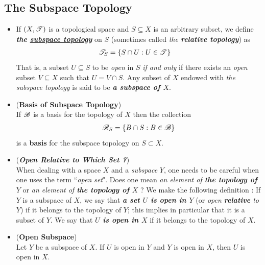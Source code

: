 \documentclass[11pt]{article}
\begin{document}
\subsection{The Subspace Topology}
\begin{itemize}
\item \begin{definition}
If $(X, {\mathscr T})$ is a topological space and $S \subseteq X$ is an arbitrary subset, we define \emph{\textbf{the \underline{subspace topology}}} on $S$ (sometimes called \emph{the \textbf{relative topology}}) as
\begin{align*}
{\mathscr T}_{S} &= \left\{S\cap U: U \in {\mathscr T}\right\}
\end{align*} 
That is, a subset $U \subseteq S$ to be \emph{open} in $S$ \emph{if and only} if there exists an \emph{open} subset $V \subseteq X$ such that $U = V \cap S$.  Any subset of $X$ endowed with \emph{the subspace topology} is said to be \emph{\textbf{a subspace of $X$}}.
\end{definition}

\item \begin{lemma} (\textbf{Basis of Subspace Topology})\\
If ${\mathscr B}$ is a basis for the topology of $X$ then the collection
\begin{align*}
{\mathscr B}_{S} = \left\{B \cap S:  B \in {\mathscr B}\right\}
\end{align*}
is a \textbf{basis}  for the subspace topology on $S \subset X$.
\end{lemma}

\item \begin{remark} (\emph{\textbf{Open Relative to Which Set ?}})\\
When dealing with a space $X$ and a \emph{subspace} $Y$, one needs to be careful when one uses the term ``\emph{open set}". Does one mean \emph{an element of \textbf{the topology of $Y$}} or \emph{an element of \textbf{the topology of $X$}} ? We make the following definition : If $Y$ is a subspace of $X$, we say that \emph{\textbf{a set $U$ is open in $Y$}} (or \emph{open \textbf{relative} to $Y$}) if it belongs to the topology of $Y$; this implies in particular that it is a subset of $Y$. We say that \emph{\textbf{$U$ is open in $X$}} if it belongs to the topology of $X$.
\end{remark}

\item \begin{lemma} (\textbf{Open Subspace})\\
Let $Y$ be a subspace of $X$. If $U$ is open in $Y$ and $Y$ is open in $X$, then $U$ is open in $X$.
\end{lemma}


\end{itemize}
\end{document}
